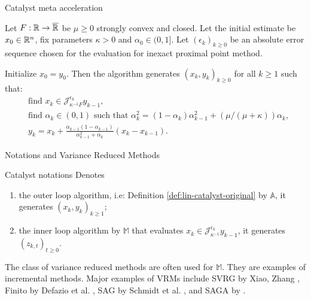 \documentclass[11pt]{beamer}
\theoremstyle{definition}
\begin{document}
        \begin{frame}{Catalyst meta acceleration}
            \begin{definition}\label{def:lin-catalyst-original}
                Let $F:\mathbb R \rightarrow \overline {\mathbb R}$ be $\mu \ge 0$ strongly convex and closed. 
                Let the initial estimate be $x_0 \in \mathbb R^n$, fix parameters $\kappa > 0$ and $\alpha_0 \in (0, 1]$. 
                Let $(\epsilon_k)_{k \ge 0}$ be an absolute error sequence chosen for the evaluation for inexact proximal point method. 
                {\small
                \begin{tcolorbox}
                    Initialize $x_0 = y_0$. Then the algorithm generates $(x_k, y_k)_{k\ge 0}$ for all $k \ge 1$ such that: 
                    \begin{align*}
                        & \text{find } x_k \in \mathcal J_{\kappa^{-1}F}^{\epsilon_k} y_{k - 1}, 
                        \\
                        & \text{find } \alpha_k \in (0, 1) \text{ such that } \alpha_k^2 = (1 - \alpha_k)\alpha_{k - 1}^2 + (\mu/(\mu + \kappa))\alpha_k,
                        \\
                        & 
                        y_{k} = x_k + \frac{\alpha_{k - 1}(1 - \alpha_{k - 1})}{\alpha_{k - 1}^2 + \alpha_k}(x_k - x_{k - 1}). 
                    \end{align*}
                \end{tcolorbox}
                }
            \end{definition}
        \end{frame}
        \begin{frame}{Notations and Variance Reduced Methods}
            \begin{block}{Catalyst notations}
                Denotes
                \begin{enumerate}
                    \item the outer loop algorithm, i.e: Definition \ref{def:lin-catalyst-original} by $\mathbb A$, it generates $(x_k, y_k)_{k \ge 1}$; 
                    \item the inner loop algorithm by $\mathbb M$ that evaluates $x_k \in \mathcal J_{\kappa^{-1}}^{\epsilon_k} y_{k - 1}$, it generates $(z_{k, t})_{t \ge 0}$. 
                \end{enumerate}    
            \end{block}
            The class of variance reduced methods are often used for $\mathbb M$. 
            They are examples of incremental methods. 
            Major examples of VRMs include SVRG by Xiao, Zhang \cite{xiao_proximal_2014}, Finito by Defazio et al. \cite{defazio_finito_2014}, SAG by Schmidt et al. \cite{schmidt_minimizing_2017}, and SAGA by \cite{defazio_saga_2014}. 
        \end{frame}
\end{document}
